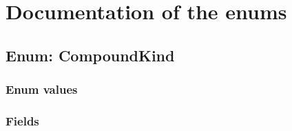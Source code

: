 \documentclass[11pt, oneside, a4paper]{book}
\begin{document}
\setcounter{tocdepth}{1}
\tableofcontents

\chapter{Documentation of the enums}

\hypertarget{SoftwareEngineeringTools.{}Documentation.{}CompoundKind}{}
\section{Enum: CompoundKind}

\subsection{Enum values}

\subsection{Fields}
\end{document}
